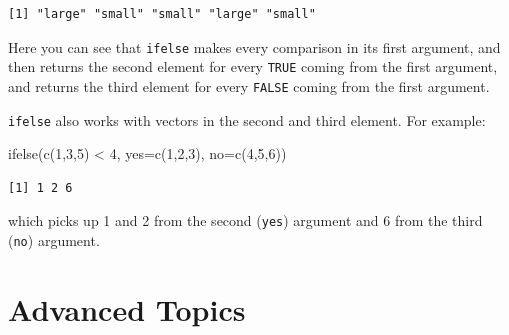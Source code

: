 \documentclass[
  letterpaper,
  DIV=11,
  numbers=noendperiod]{scrreprt}
\newenvironment{Shaded}{\begin{snugshade}}{\end{snugshade}}
\newcommand{\AttributeTok}[1]{\textcolor[rgb]{0.40,0.45,0.13}{#1}}
\newcommand{\ControlFlowTok}[1]{\textcolor[rgb]{0.00,0.23,0.31}{\textbf{#1}}}
\newcommand{\DecValTok}[1]{\textcolor[rgb]{0.68,0.00,0.00}{#1}}
\newcommand{\FunctionTok}[1]{\textcolor[rgb]{0.28,0.35,0.67}{#1}}
\newcommand{\NormalTok}[1]{\textcolor[rgb]{0.00,0.23,0.31}{#1}}
\newcommand{\OtherTok}[1]{\textcolor[rgb]{0.00,0.23,0.31}{#1}}
\newcommand{\SpecialCharTok}[1]{\textcolor[rgb]{0.37,0.37,0.37}{#1}}
\newcommand{\StringTok}[1]{\textcolor[rgb]{0.13,0.47,0.30}{#1}}
\begin{document}
\begin{Shaded}
\end{Shaded}

\begin{verbatim}
[1] "large" "small" "small" "large" "small"
\end{verbatim}

Here you can see that \texttt{ifelse} makes every comparison in its
first argument, and then returns the second element for every
\texttt{TRUE} coming from the first argument, and returns the third
element for every \texttt{FALSE} coming from the first argument.

\texttt{ifelse} also works with vectors in the second and third element.
For example:

\begin{Shaded}
\begin{Highlighting}[]
  \FunctionTok{ifelse}\NormalTok{(}\FunctionTok{c}\NormalTok{(}\DecValTok{1}\NormalTok{,}\DecValTok{3}\NormalTok{,}\DecValTok{5}\NormalTok{) }\SpecialCharTok{\textless{}} \DecValTok{4}\NormalTok{, }\AttributeTok{yes=}\FunctionTok{c}\NormalTok{(}\DecValTok{1}\NormalTok{,}\DecValTok{2}\NormalTok{,}\DecValTok{3}\NormalTok{), }\AttributeTok{no=}\FunctionTok{c}\NormalTok{(}\DecValTok{4}\NormalTok{,}\DecValTok{5}\NormalTok{,}\DecValTok{6}\NormalTok{))}
\end{Highlighting}
\end{Shaded}

\begin{verbatim}
[1] 1 2 6
\end{verbatim}

which picks up 1 and 2 from the second (\texttt{yes}) argument and 6
from the third (\texttt{no}) argument.

\section{Advanced Topics}\label{advanced-topics}
\end{document}
